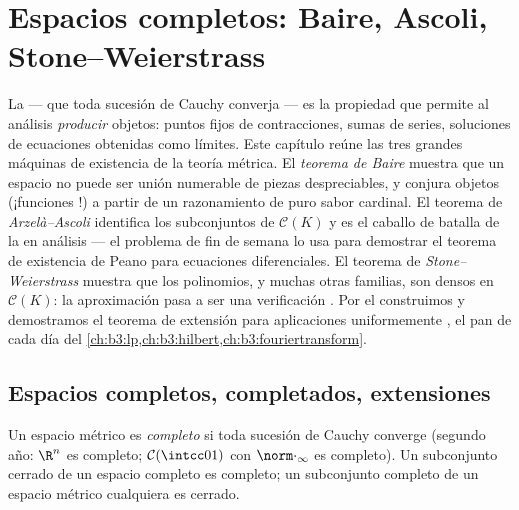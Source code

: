 \chapter{Espacios completos: Baire, Ascoli, Stone--Weierstrass}
\label{ch:b3:complete}

La  --- que toda sucesión
de Cauchy converja --- es la propiedad que permite al análisis
\emph{producir} objetos: puntos fijos de contracciones, sumas de series,
soluciones de ecuaciones obtenidas como límites. Este capítulo reúne las
tres grandes máquinas de existencia de la teoría métrica. El
\emph{teorema de Baire} muestra que un espacio
 no puede ser unión numerable
de piezas despreciables, y conjura objetos
(¡funciones
 !) a partir de un razonamiento de puro sabor cardinal. El teorema
de \emph{Arzelà--Ascoli} identifica los subconjuntos
 de $\mathcal C(K)$ y es el
caballo de batalla de la  en análisis --- el problema de fin
de semana lo usa para demostrar el teorema de existencia de Peano para
ecuaciones diferenciales. El teorema de \emph{Stone--Weierstrass}
muestra que los polinomios, y muchas otras familias, son densos en
$\mathcal C(K)$: la aproximación pasa a ser una verificación
. Por el  construimos
 y demostramos el
teorema de extensión para
aplicaciones uniformemente
, el pan de cada día del
\cref{ch:b3:lp,ch:b3:hilbert,ch:b3:fouriertransform}.

\section{Espacios completos, completados, extensiones}

\begin{definition}\label{def:b3:complete:complete}
Un espacio métrico es \emph{completo} si
toda sucesión de Cauchy converge (segundo año: $\R^n$ es completo;
$\mathcal C(\intcc01)$ con $\norm\cdot_\infty$ es completo). Un
subconjunto cerrado de un espacio completo es completo; un subconjunto
completo de un espacio métrico cualquiera es cerrado.
\end{definition}

